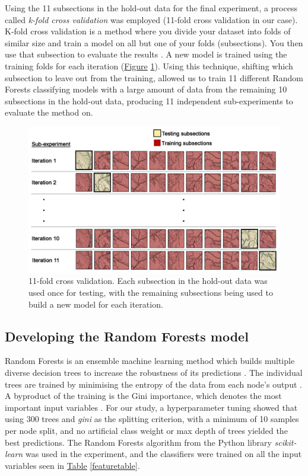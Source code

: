 \documentclass[]{interact}
\theoremstyle{plain}%
\theoremstyle{definition}
\theoremstyle{remark}
\begin{document}
Using the 11 subsections in the hold-out data for the final experiment, a process called \textit{k-fold cross validation} was employed (11-fold cross validation in our case). K-fold cross validation is a method where you divide your dataset into folds of similar size and train a model on all but one of your folds (subsections). You then use that subsection to evaluate the results \citep{crossvalidation}. A new model is trained using the training folds for each iteration (\hyperref[fig:crossvalidation]{Figure} \ref{fig:crossvalidation}). Using this technique, shifting which subsection to leave out from the training, allowed us to train 11 different Random Forests classifying models with a large amount of data from the remaining 10 subsections in the hold-out data, producing 11 independent sub-experiments to evaluate the method on.

\begin{figure}[!htb]
    \centering
    \includegraphics[width=1\linewidth]{images/cross_validation_lo.jpg}
    \caption{11-fold cross validation. Each subsection in the hold-out data was used once for testing, with the remaining subsections being used to build a new model for each iteration.}
    \label{fig:crossvalidation}
\end{figure}

\subsection{Developing the Random Forests model}

Random Forests is an ensemble machine learning method which builds multiple diverse decision trees to increase the robustness of its predictions \citep{breiman,flach}. The individual trees are trained by minimising the entropy of the data from each node’s output \citep{kotsiantis}. A byproduct of the training is the Gini importance, which denotes the most important input variables \citep{gini}. For our study, a hyperparameter tuning showed that using 300 trees and \textit{gini} as the splitting criterion, with a minimum of 10 samples per node split, and no artificial class weight or max depth of trees yielded the best predictions. The Random Forests algorithm from the Python library \textit{scikit-learn} \citep{scikit-learn} was used in the experiment, and the classifiers were trained on all the input variables seen in \hyperref[featuretable]{Table} \ref{featuretable}.
\end{document}

